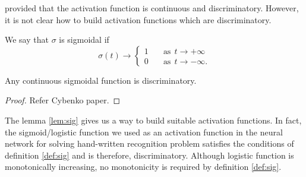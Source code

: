 provided that the activation function is continuous and discriminatory. However, it is not clear how to build activation functions which are 
discriminatory.
\begin{definition}
    \label{def:sig}
    We say that $\sigma$ is sigmoidal if 
    \begin{equation*}
        \sigma(t) \rightarrow 
         \begin{cases}
           1 &\quad \text{as} \ \ t\rightarrow +\infty\\
           0 &\quad \text{as} \ \ t\rightarrow -\infty.
         \end{cases}
    \end{equation*}
\end{definition}
\begin{lemma}
    \label{lem:sig}
    Any continuous sigmoidal function is discriminatory.
\end{lemma}
\begin{proof}
    Refer Cybenko paper.
\end{proof}
The lemma \ref{lem:sig} gives us a way to build suitable activation functions. In fact, the sigmoid/logistic function we used as an activation function
in the neural network for solving hand-written recognition problem satisfies the conditions of definition \ref{def:sig} and is therefore, discriminatory. Although 
logistic function is monotonically increasing, no monotonicity is required by definition \ref{def:sig}.